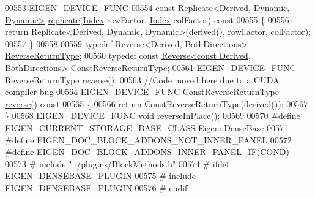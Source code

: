 \begin{DoxyCode}
\hyperlink{group___core___module_a21b239da40faaef9658b4632d7dd77a7}{00553}     EIGEN\_DEVICE\_FUNC
\hyperlink{group___core___module_a4475dc25a383c84656f5c55b890ecacf}{00554}     \textcolor{keyword}{const} \hyperlink{group___core___module_class_eigen_1_1_replicate}{Replicate<Derived, Dynamic, Dynamic>} 
      \hyperlink{group___core___module_a4475dc25a383c84656f5c55b890ecacf}{replicate}(\hyperlink{namespace_eigen_a62e77e0933482dafde8fe197d9a2cfde}{Index} rowFactor, \hyperlink{namespace_eigen_a62e77e0933482dafde8fe197d9a2cfde}{Index} colFactor)\textcolor{keyword}{ const}
00555 \textcolor{keyword}{    }\{
00556       \textcolor{keywordflow}{return} \hyperlink{group___core___module_class_eigen_1_1_replicate}{Replicate<Derived, Dynamic, Dynamic>}(derived(), rowFactor,
       colFactor);
00557     \}
00558 
00559     \textcolor{keyword}{typedef} \hyperlink{group___core___module_class_eigen_1_1_reverse}{Reverse<Derived, BothDirections>} 
      \hyperlink{group___core___module_class_eigen_1_1_reverse}{ReverseReturnType};
00560     \textcolor{keyword}{typedef} \textcolor{keyword}{const} \hyperlink{group___core___module_class_eigen_1_1_reverse}{Reverse<const Derived, BothDirections>} 
      \hyperlink{group___core___module_class_eigen_1_1_reverse}{ConstReverseReturnType};
00561     EIGEN\_DEVICE\_FUNC ReverseReturnType reverse();
00563     \textcolor{comment}{//Code moved here due to a CUDA compiler bug}
\hyperlink{group___core___module_ada2ea028e35de0beef990fa0f6e3dee1}{00564}     EIGEN\_DEVICE\_FUNC ConstReverseReturnType \hyperlink{group___core___module_ada2ea028e35de0beef990fa0f6e3dee1}{reverse}()\textcolor{keyword}{ const}
00565 \textcolor{keyword}{    }\{
00566       \textcolor{keywordflow}{return} ConstReverseReturnType(derived());
00567     \}
00568     EIGEN\_DEVICE\_FUNC \textcolor{keywordtype}{void} reverseInPlace();
00569 
00570 \textcolor{preprocessor}{#define EIGEN\_CURRENT\_STORAGE\_BASE\_CLASS Eigen::DenseBase}
00571 \textcolor{preprocessor}{#define EIGEN\_DOC\_BLOCK\_ADDONS\_NOT\_INNER\_PANEL}
00572 \textcolor{preprocessor}{#define EIGEN\_DOC\_BLOCK\_ADDONS\_INNER\_PANEL\_IF(COND)}
00573 \textcolor{preprocessor}{#   include "../plugins/BlockMethods.h"}
00574 \textcolor{preprocessor}{#   ifdef EIGEN\_DENSEBASE\_PLUGIN}
00575 \textcolor{preprocessor}{#     include EIGEN\_DENSEBASE\_PLUGIN}
\hyperlink{group___core___module_abfa7020bf152e0a39e2a124080c4d59c}{00576} \textcolor{preprocessor}{#   endif}

\end{DoxyCode}
